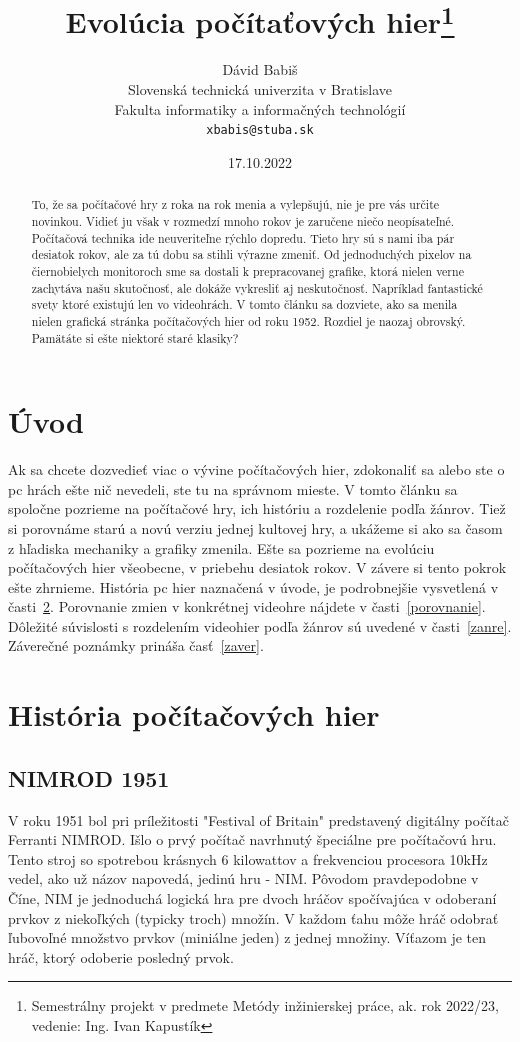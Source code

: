 \documentclass[10pt,oneside,slovak,a4paper]{article}
\title{Evolúcia počítaťových hier\thanks{Semestrálny projekt v predmete Metódy inžinierskej práce, ak. rok 2022/23, vedenie: Ing. Ivan Kapustík}} %
\author{Dávid Babiš\\[2pt]
	{\small Slovenská technická univerzita v Bratislave}\\
	{\small Fakulta informatiky a informačných technológií}\\
	{\small \texttt{xbabis@stuba.sk}}
	}
\date{\small 17.10.2022} %
\begin{document}
\maketitle

\begin{abstract}
To, že sa počítačové hry z roka na rok menia a vylepšujú, nie je pre vás určite novinkou. Vidieť ju však v rozmedzí mnoho rokov je zaručene niečo neopísateľné. Počítačová technika ide neuveriteľne rýchlo dopredu. Tieto hry sú s nami iba pár desiatok rokov, ale za tú dobu sa stihli výrazne zmeniť. Od jednoduchých pixelov na čiernobielych monitoroch sme sa dostali k prepracovanej grafike, ktorá nielen verne zachytáva našu skutočnosť, ale dokáže vykresliť aj neskutočnosť. Napríklad fantastické svety ktoré existujú len vo videohrách.  V tomto článku sa dozviete, ako sa menila nielen grafická stránka počítačových hier od roku 1952. Rozdiel je naozaj obrovský. Pamätáte si ešte niektoré staré klasiky?
\end{abstract}



\section{Úvod}
Ak sa chcete dozvedieť viac o vývine počítačových hier, zdokonaliť sa alebo ste o pc hrách ešte nič nevedeli, ste tu na správnom mieste. V tomto článku sa spoločne pozrieme na počítačové hry, ich históriu a rozdelenie podľa žánrov. Tiež si porovnáme starú a novú verziu jednej kultovej hry, a ukážeme si ako sa časom z hľadiska mechaniky a grafiky zmenila. Ešte sa pozrieme na evolúciu počítačových hier všeobecne, v priebehu desiatok rokov. V závere si tento pokrok ešte zhrnieme. História pc hier naznačená v úvode, je podrobnejšie vysvetlená v časti~\ref{historia}. Porovnanie zmien v konkrétnej videohre nájdete v časti~\ref{porovnanie}. 
Dôležité súvislosti s rozdelením videohier podľa žánrov sú uvedené v časti~\ref{zanre}.
Záverečné poznámky prináša časť~\ref{zaver}.

\section{História počítačových hier} \label{historia}

\subsection{NIMROD 1951}

V roku 1951 bol pri príležitosti "Festival of Britain" predstavený digitálny počítač Ferranti NIMROD. Išlo o prvý počítač navrhnutý špeciálne pre počítačovú hru. Tento stroj so spotrebou krásnych 6 kilowattov a frekvenciou procesora 10kHz vedel, ako už názov napovedá, jedinú hru - NIM. Pôvodom pravdepodobne v Číne, NIM je jednoduchá logická hra pre dvoch hráčov spočívajúca v odoberaní prvkov z niekoľkých (typicky troch) množín. V každom ťahu môže hráč odobrať ľubovoľné množstvo prvkov (miniálne jeden) z jednej množiny. Víťazom je ten hráč, ktorý odoberie posledný prvok.
\end{document}
